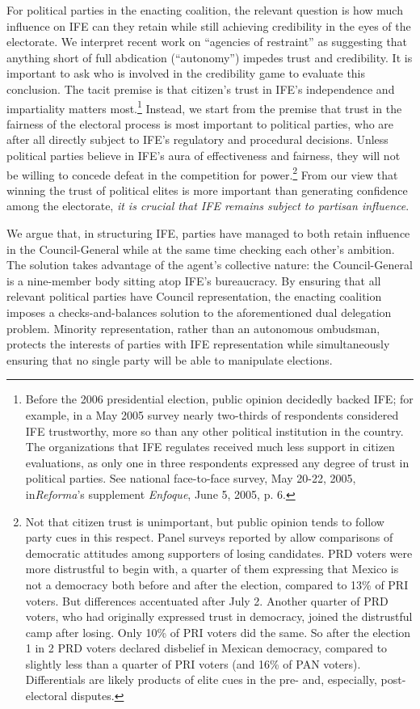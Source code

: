 \documentclass[12 pt, letter]{article}
\begin{document}
For political parties in the enacting coalition, the relevant
question is how much influence on IFE can they retain while still
achieving credibility in the eyes of the electorate.  We interpret
recent work on ``agencies of restraint'' \citep{Schedler1999,
Eisenstadt2004} as suggesting that anything short of full abdication
(``autonomy'') impedes trust and credibility.  It is important to
ask who is involved in the credibility game to evaluate this
conclusion.  The tacit premise is that citizen's trust in IFE's
independence and impartiality matters most.\footnote{Before the 2006
presidential election, public opinion decidedly backed IFE; for
example, in a May 2005 survey nearly two-thirds of respondents
considered IFE trustworthy, more so than any other political
institution in the country.  The organizations that IFE regulates
received much less support in citizen evaluations, as only one in
three respondents expressed any degree of trust in political
parties.  See national face-to-face survey, May 20-22, 2005,
in\emph{Reforma}'s supplement \emph{Enfoque}, June 5, 2005, p. 6.}
Instead, we start from the premise that trust in the fairness of the
electoral process is most important to political parties, who are
after all directly subject to IFE's regulatory and procedural
decisions.  Unless political parties believe in IFE's aura of
effectiveness and fairness, they will not be willing to concede
defeat in the competition for power.\footnote{Not that citizen trust
is unimportant, but public opinion tends to follow party cues in
this respect.  Panel surveys reported by \citet{Estrada2007} allow
comparisons of democratic attitudes among supporters of losing
candidates. PRD voters were more distrustful to begin with, a
quarter of them expressing that Mexico is not a democracy both
before and after the election, compared to 13\% of PRI voters. But
differences accentuated after July 2.  Another quarter of PRD
voters, who had originally expressed trust in democracy, joined the
distrustful camp after losing.  Only 10\% of PRI voters did the
same. So after the election 1 in 2 PRD voters declared disbelief in
Mexican democracy, compared to slightly less than a quarter of PRI
voters (and 16\% of PAN voters). Differentials are likely products
of elite cues in the pre- and, especially, post-electoral disputes.}
From our view that winning the trust of political elites is more
important than generating confidence among the electorate, \emph{it
is crucial that IFE remains subject to partisan influence}.

We argue that, in structuring IFE, parties have managed to both
retain influence in the Council-General while at the same time
checking each other's ambition.  The solution takes advantage of the
agent's collective nature: the Council-General is a nine-member body
sitting atop IFE's bureaucracy.  By ensuring that all relevant
political parties have Council representation, the enacting
coalition imposes a checks-and-balances solution to the
aforementioned dual delegation problem. Minority representation,
rather than an autonomous ombudsman, protects the interests of
parties with IFE representation while simultaneously ensuring that
no single party will be able to manipulate elections.
\end{document}
